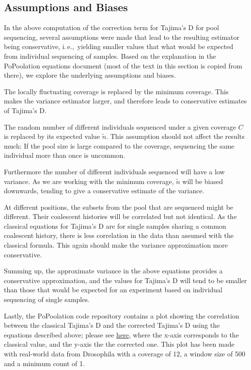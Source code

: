 \documentclass[a4paper,fontsize=9pt,DIV=14]{scrartcl}
\newcommand{\ie}{i.\,e.,~}
\begin{document}

\subsection{Assumptions and Biases}
\label{supp:sec:TajimaD:sub:AssumptionsBiases}

In the above computation of the correction term for Tajima's D for pool sequencing,
several assumptions were made that lead to the resulting estimator being conservative,
\ie yielding smaller values that what would be expected from individual sequencing of samples.
Based on the explanation in the PoPoolation equations document (most of the text in this section is copied from there),
we explore the underlying assumptions and biases.

The locally fluctuating coverage is replaced by the minimum coverage.
This makes the variance estimator larger, and therefore leads to conservative estimates of Tajima's D.

The random number of different individuals sequenced under a given coverage $C$
is replaced by its expected value $\tilde{n}$.
This assumption should not affect the results much:
If the pool size is large compared to the coverage, sequencing the same individual more than once is uncommon.

Furthermore the number of different individuals sequenced will have a low variance.
As we are working with the minimum coverage, $\tilde{n}$ will be biased downwards,
tending to give a conservative estimate of the variance.

At different positions, the subsets from the pool that are sequenced might be different.
Their coalescent histories will be correlated but not identical.
As the classical equations for Tajima's D are for single samples sharing a common coalescent history,
there is less correlation in the data than assumed with the classical formula.
This again should make the variance approximation more conservative.

Summing up, the approximate variance in the above equations provides a conservative approximation,
and the values for Tajima's D will tend to be smaller than those that would be expected
for an experiment based on individual sequencing of single samples.

Lastly, the PoPoolation code repository contains a plot showing the correlation between the classical Tajima's D
and the corrected Tajima's D using the equations described above;
please see \href{https://github.com/lczech/popoolation/raw/master/files/correlation_classic_correctedTajimasD.png}{here},
where the x-axis corresponds to the classical value, and the y-axis the the corrected one.
This plot has been made with real-world data from Drosophila with a coverage of 12,
a window size of 500 and a minimum count of 1.
\end{document}
